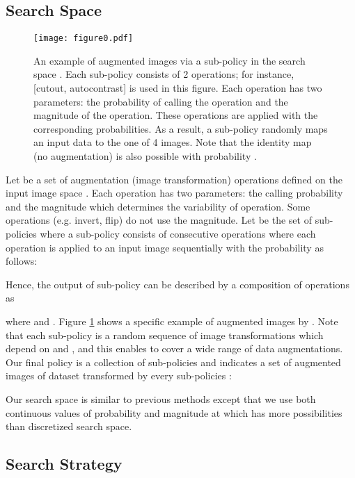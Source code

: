 \documentclass{article}
\newcommand{\cmtt}[1]{{\fontfamily{cmtt}\selectfont #1}}
\begin{document}
\subsection{Search Space}
\label{subsec:search-space}

 \begin{figure}
     \centering
     \texttt{[image: figure0.pdf]}

     \caption{An example of augmented images via a sub-policy in the search space . Each sub-policy  consists of 2 operations; for instance, [\cmtt{cutout}, \cmtt{autocontrast}] is used in this figure. Each operation  has two parameters: the probability  of calling the operation and the magnitude  of the operation. These operations are applied with the corresponding probabilities. As a result, a sub-policy randomly maps an input data to the one of 4 images. Note that the identity map (no augmentation) is also possible with probability .}
     \label{fig:sub-policy}
 \end{figure}

Let  be a set of augmentation (image transformation) operations  defined on the input image space . Each operation  has two parameters: the calling probability  and the magnitude  which determines the variability of operation. Some operations (e.g. \cmtt{invert}, \cmtt{flip}) do not use the magnitude. Let  be the set of sub-policies where a sub-policy  consists of  consecutive operations  where each operation is applied to an input image sequentially with the probability  as follows:

Hence, the output of sub-policy  can be described by a composition of operations as 

where  and . Figure \ref{fig:sub-policy} shows a specific example of augmented images by . Note that each sub-policy  is a random sequence of image transformations which depend on  and , and this enables to cover a wide range of data augmentations. Our final policy 
 is a collection of  sub-policies and 
indicates a set of augmented images of dataset  transformed by every sub-policies :

Our search space is similar to previous methods except that we use both continuous values of probability  and magnitude  at  which has more possibilities than discretized search space. 







\subsection{Search Strategy}
\label{subsec:search-strategy}
\end{document}
